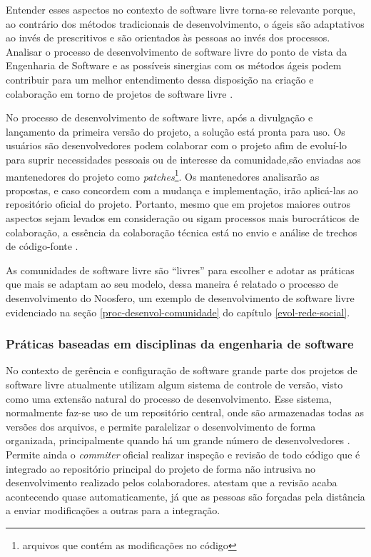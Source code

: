 Entender esses aspectos no contexto de software livre torna-se relevante porque, ao contrário dos métodos tradicionais de desenvolvimento, o ágeis são adaptativos ao invés de prescritivos e são orientados às pessoas ao invés dos processos. Analisar o processo de desenvolvimento de software livre do ponto de vista da Engenharia de Software e as possíveis sinergias com os métodos ágeis podem contribuir para um melhor entendimento dessa disposição na criação e colaboração em torno de projetos de software livre \cite{meirelles2013}.

No processo de desenvolvimento de software livre, após a divulgação e lançamento da primeira versão do projeto, a solução está pronta para uso. Os usuários são desenvolvedores podem colaborar com o projeto afim de evoluí-lo para suprir necessidades pessoais ou de interesse da comunidade,são enviadas aos mantenedores do projeto como \textit{patches}\footnote{arquivos que contém as modificações no código}. Os mantenedores analisarão as propostas, e caso concordem com a mudança e implementação, irão aplicá-las ao repositório oficial do projeto. Portanto, mesmo que em projetos maiores outros aspectos sejam levados em consideração ou sigam processos mais burocráticos de colaboração, a essência da colaboração técnica está no envio e análise de trechos de código-fonte \cite{meirelles2013}.

As comunidades de software livre são ``livres'' para escolher e adotar as práticas que mais se adaptam ao seu modelo, dessa maneira é relatado o processo de desenvolvimento do Noosfero, um exemplo de desenvolvimento de software livre evidenciado na seção \ref{proc-desenvol-comunidade} do capítulo \ref{evol-rede-social}.

\subsubsection{Práticas baseadas em disciplinas da engenharia de software}


No contexto de gerência e configuração de software grande parte dos projetos de software livre atualmente utilizam algum sistema de controle de versão, visto como uma extensão natural do processo de desenvolvimento. Esse sistema, normalmente faz-se uso de um repositório central, onde são armazenadas todas as versões dos arquivos, e permite paralelizar o desenvolvimento de forma organizada, principalmente quando há um grande número de desenvolvedores \cite{reis2001caracterizaccao}. Permite ainda o \textit{commiter} oficial realizar inspeção e revisão de todo código que é integrado ao repositório principal do projeto de forma não intrusiva no desenvolvimento realizado pelos colaboradores.  atestam que a revisão acaba acontecendo quase automaticamente, já que as pessoas são forçadas pela distância a enviar modificações a outras para a integração.

